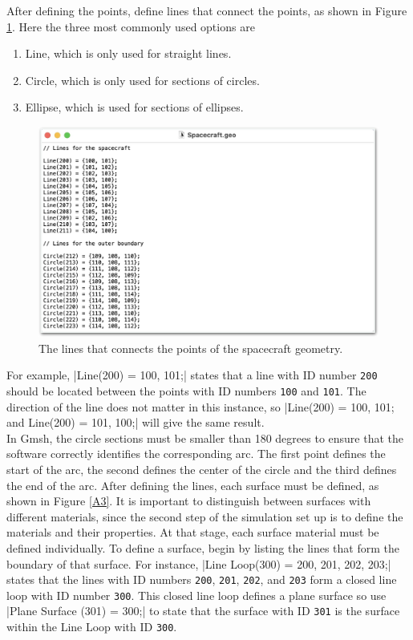 \documentclass[a4paper, 12pt]{article}
\begin{document}
After defining the points, define lines that connect the points, as shown in Figure \ref{A2}. Here the three most commonly used options are

\begin{enumerate}[itemsep=-0.2em]
    \item Line, which is only used for straight lines.
    \item Circle, which is only used for sections of circles.
    \item Ellipse, which is used for sections of ellipses.
\end{enumerate}

\begin{figure}[!ht]
    \centering
    \includegraphics[width=1\textwidth]{figA2.jpg}
    \caption{The lines that connects the points of the spacecraft geometry.}
    \label{A2}
\end{figure}

For example, |Line(200) = {100, 101};| states that a line with ID number \verb|200| should be located between the points with ID numbers \verb|100| and \verb|101|. The direction of the line does not matter in this instance, so |Line(200) = {100, 101}; and Line(200) = {101, 100};| will give the same result.\\

In Gmsh, the circle sections must be smaller than 180 degrees to ensure that the software correctly identifies the corresponding arc. The first point defines the start of the arc, the second defines the center of the circle and the third defines the end of the arc. After defining the lines, each surface must be defined, as shown in Figure \ref{A3}. It is important to distinguish between surfaces with different materials, since the second step of the simulation set up is to define the materials and their properties. At that stage, each surface material must be defined individually. To define a surface, begin by listing the lines that form the boundary of that surface. For instance, |Line Loop(300) = {200, 201, 202, 203};| states that the lines with ID numbers \verb|200|, \verb|201|, \verb|202|, and \verb|203| form a closed line loop with ID number \verb|300|. This closed line loop defines a plane surface so use |Plane Surface (301) = {300};| to state that the surface with ID \verb|301| is the surface within the Line Loop with ID \verb|300|.
\end{document}
